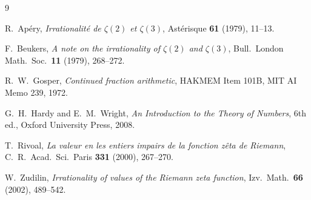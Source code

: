 \documentclass[12pt]{amsart}
\theoremstyle{definition}
\begin{document}
\begin{thebibliography}{9}

R.~Ap\'ery,
\emph{Irrationalit\'e de $\zeta(2)$ et $\zeta(3)$},
Ast\'erisque \textbf{61} (1979), 11--13.

F.~Beukers,
\emph{A note on the irrationality of $\zeta(2)$ and $\zeta(3)$},
Bull.\ London Math.\ Soc.\ \textbf{11} (1979), 268--272.

R.~W.~Gosper,
\emph{Continued fraction arithmetic},
HAKMEM Item 101B, MIT AI Memo 239, 1972.

G.~H.~Hardy and E.~M.~Wright,
\emph{An Introduction to the Theory of Numbers}, 6th ed.,
Oxford University Press, 2008.

T.~Rivoal,
\emph{La valeur en les entiers impairs de la fonction z\^eta de Riemann},
C.~R.\ Acad.\ Sci.\ Paris \textbf{331} (2000), 267--270.

W.~Zudilin,
\emph{Irrationality of values of the Riemann zeta function},
Izv.\ Math.\ \textbf{66} (2002), 489--542.

\end{thebibliography}
\end{document}
